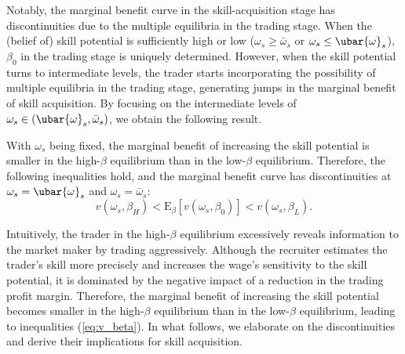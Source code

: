 Notably, the marginal benefit curve in the skill-acquisition stage has discontinuities due to the multiple equilibria in the trading stage. When the (belief of) skill potential is sufficiently high or low ($\omega_{s}\geq \bar{\omega}_{s}$ or $\omega_{s}\leq \ubar{\omega}_{s}$), $\beta_{0}$ in the trading stage is uniquely determined. However, when the skill potential turns to intermediate levels, the trader starts incorporating the possibility of multiple equilibria in the trading stage, generating jumps in the marginal benefit of skill acquisition. By focusing on the intermediate levels of $\omega_{s}\in(\ubar{\omega}_{s},\bar{\omega}_{s})$, we obtain the following result.
\begin{lemma}\label{lem:MB_beta}
With $\omega_{s}$ being fixed, the marginal benefit of increasing the skill potential is smaller in the high-$\beta$ equilibrium than in the low-$\beta$ equilibrium. Therefore, the following inequalities hold, and the marginal benefit curve has discontinuities at $\omega_{s}=\ubar{\omega}_{s}$ and $\omega_{s}=\bar{\omega}_{s}$:
\begin{equation}
v(\omega_{s},\beta_{H}) < \mathrm{E}_{\beta}[v(\omega_{s},\beta_{0})] < v(\omega_{s},\beta_{L}). \label{eq:v_beta}
\end{equation}
\end{lemma}

Intuitively, the trader in the high-$\beta$ equilibrium excessively reveals information to the market
maker by trading aggressively. Although the recruiter estimates the trader's skill more precisely and increases the wage's sensitivity to the skill potential, it is dominated by the negative impact of a reduction in the trading profit margin. Therefore, the marginal benefit of increasing the skill potential becomes smaller in the high-$\beta$ equilibrium than in the low-$\beta$ equilibrium, leading to inequalities (\ref{eq:v_beta}). In what follows, we elaborate on the discontinuities and derive their implications for skill acquisition. 

